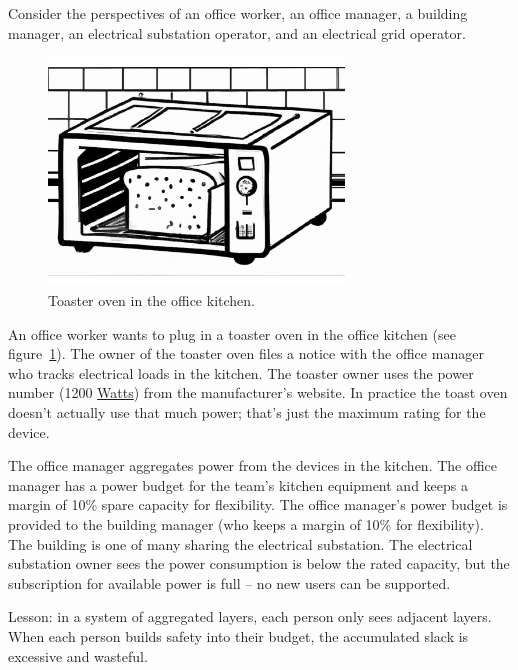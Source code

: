 Consider the perspectives of an office worker, an office manager, a building manager, an electrical substation operator, and an electrical grid operator.
\begin{center}
\begin{figure}
    \centering
    \includegraphics[width=0.7\textwidth,trim={0 2cm 0 0},clip]{images/toaster_oven_in_office_kitchen.pdf}
    \caption{Toaster oven in the office kitchen.}
    \label{fig:toaster_oven}
\end{figure}
\end{center}

\begin{mdframed}[frametitle={Layers of Margins},frametitlerule=true,frametitlealignment=\centering]
An office worker wants to plug in a toaster oven in the office kitchen (see figure~\ref{fig:toaster_oven}). The owner of the toaster oven files a notice with the office manager who tracks electrical loads in the kitchen. 
The toaster owner uses the power number (1200 \href{https://en.wikipedia.org/wiki/Watt}{Watts}) 
from the manufacturer's website. In practice the toast oven doesn't actually use that much power; that's just the maximum rating for the device. 

The office manager aggregates power from the devices in the kitchen. The office manager has a power budget for the team's kitchen equipment and keeps a margin of 10\% spare capacity for flexibility. The office manager's power budget is provided to the building manager (who keeps a margin of 10\% for flexibility). The building is one of many sharing the electrical substation. The electrical substation owner sees the power consumption is below the rated capacity, but the subscription for available power is full -- no new users can be supported.
\end{mdframed}
Lesson: in a system of aggregated layers, each person only sees adjacent layers. When each person builds safety into their budget, the accumulated slack is excessive and wasteful.

